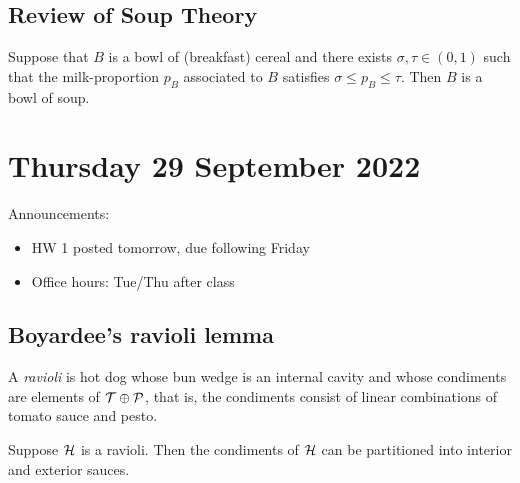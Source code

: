 \documentclass[12pt,notitlepage]{report}
\begin{document}
	\section{Review of Soup Theory}

		\begin{thm}
			Suppose that $B$ is a bowl of (breakfast) cereal
			and there exists $\sigma,\tau\in(0,1)$ such that the
			milk-proportion $p_B$ associated
			to $B$  satisfies $\sigma\leq p_B\leq \tau$.
			Then $B$ is a bowl of soup.
		\end{thm}


\chapter{Thursday 29 September 2022}

	Announcements:
	\begin{itemize}
		\item HW 1 posted tomorrow, due following Friday
		\item Office hours: Tue/Thu after class
	\end{itemize}

	\section{Boyardee's ravioli lemma}

		A \emph{ravioli} is hot dog whose bun wedge is an internal cavity
		and whose condiments are elements of $\cal{T}\oplus\cal{P}$,
		that is, the condiments consist of linear combinations of
		tomato sauce and pesto.

		\begin{lem}
			Suppose $\cal H$ is a ravioli.
			Then the condiments of $\cal H$ can be partitioned into
			interior and exterior sauces.
		\end{lem}

\end{document}
